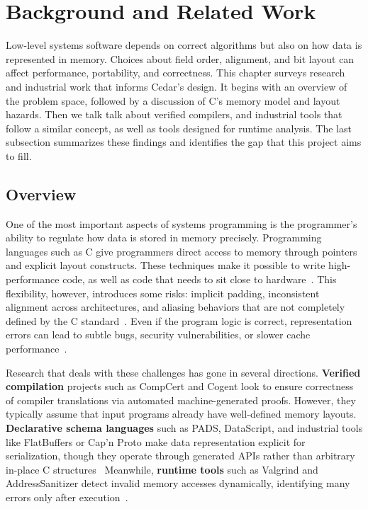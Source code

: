 \section{Background and Related Work}
Low-level systems software depends on correct algorithms but also on
how data is represented in memory. Choices about field order, alignment, and
bit layout can affect performance, portability, and correctness. This chapter
surveys research and industrial work that informs Cedar's design. It begins
with an overview of the problem space, followed by a 
discussion of C's memory model and layout hazards.
Then we talk talk about verified compilers, and industrial
tools that follow a similar concept, as well as tools
designed for runtime analysis.
The last subsection summarizes these findings and identifies
the gap that this project aims to fill.

\subsection{Overview} \label{5-background}
One of the most important aspects of systems programming is
the programmer's ability to regulate how data is stored in memory precisely.
Programming languages such as C give programmers direct access to memory
through pointers and explicit layout constructs.
These techniques make it possible to write high-performance code,
as well as code that needs to sit close to hardware~\autocite{memory_bottleneck, C_embedded_programming}.
This flexibility, however, introduces some risks: implicit
padding, inconsistent alignment across architectures, and aliasing behaviors
that are not completely defined by the C
standard~\autocite{whatyouc, strict_aliasing}.
Even if the program logic is
correct, representation errors can lead to subtle bugs, security
vulnerabilities, or slower cache
performance~\autocite{memory_errors_stridharan, C_errors_study, adt_layout_faria}.

Research that deals with these challenges has gone in several directions.
\textbf{Verified compilation} projects such as CompCert and Cogent look to
ensure correctness of compiler translations via automated machine-generated proofs.
However, they typically assume that input programs already have well-defined memory layouts.
\textbf{Declarative schema languages} such as PADS, DataScript, and industrial
tools like FlatBuffers or Cap'n Proto make data representation explicit for
serialization, though they operate through generated APIs rather than
arbitrary in-place C 
structures~\autocite{fisher2005pads,back2002datascript,flat_buffers,capn_proto_serialization}
Meanwhile, \textbf{runtime tools} such as Valgrind and AddressSanitizer detect
invalid memory accesses dynamically, identifying many errors only after
execution~\autocite{valgrind, asan}.

